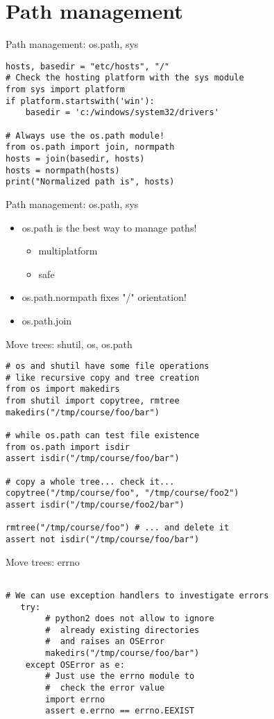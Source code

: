 \section{Path management}

\begin{frame}[fragile]{Path management: os.path, sys}
\begin{verbatim}
hosts, basedir = "etc/hosts", "/"
# Check the hosting platform with the sys module
from sys import platform
if platform.startswith('win'):
    basedir = 'c:/windows/system32/drivers'

# Always use the os.path module!
from os.path import join, normpath 
hosts = join(basedir, hosts)
hosts = normpath(hosts)
print("Normalized path is", hosts)
\end{verbatim}
\end{frame}

\begin{frame}[fragile]{Path management: os.path, sys}
\begin{itemize}
\item os.path is the best way to manage paths!
\begin{itemize}
 \item  multiplatform
 \item safe
 \end{itemize}
 
\item os.path.normpath fixes "/" orientation!
 \item os.path.join 
 \end{itemize}
\end{frame}

\begin{frame}[fragile]{Move trees: shutil, os, os.path}
\begin{verbatim}
# os and shutil have some file operations
# like recursive copy and tree creation
from os import makedirs          
from shutil import copytree, rmtree 
makedirs("/tmp/course/foo/bar")

# while os.path can test file existence
from os.path import isdir            
assert isdir("/tmp/course/foo/bar")

# copy a whole tree... check it...
copytree("/tmp/course/foo", "/tmp/course/foo2") 
assert isdir("/tmp/course/foo2/bar")            

rmtree("/tmp/course/foo") # ... and delete it
assert not isdir("/tmp/course/foo/bar")
\end{verbatim}
\end{frame}

\begin{frame}[fragile]{Move trees: errno}
\begin{verbatim}

# We can use exception handlers to investigate errors
   try:
        # python2 does not allow to ignore
        #  already existing directories
        #  and raises an OSError
        makedirs("/tmp/course/foo/bar")
    except OSError as e:
        # Just use the errno module to
        #  check the error value
        import errno
        assert e.errno == errno.EEXIST
\end{verbatim}
\end{frame}

